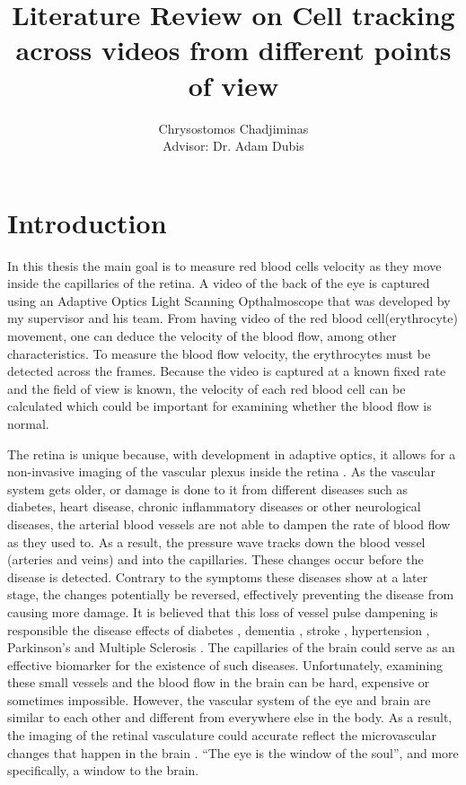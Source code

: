 \documentclass[]{article}
\title{Literature Review on Cell tracking across videos from different points of view}
\author{Chrysostomos Chadjiminas 
	\\[0.55cm]{\small Advisor: Dr. Adam Dubis}}
\begin{document}
\maketitle

\section{Introduction}

In this thesis the main goal is to measure red blood cells velocity as 
they move inside the capillaries of the retina.
A video of the back of the eye is captured using an Adaptive Optics Light Scanning Opthalmoscope that was developed by my supervisor and his team.
From having video of the red blood cell(erythrocyte) movement, one can deduce the velocity of the blood flow, among other characteristics.
To measure the blood flow velocity, the  erythrocytes must be detected across the frames. 
Because the video is captured at a known fixed rate and the field of view is known, the velocity of each red blood cell can be calculated
which could be important for examining whether the blood flow is normal.

The retina is unique because, with development in adaptive optics, it allows for a non-invasive imaging of the vascular plexus inside the retina \cite{tam_noninvasive_2010}.
As the vascular system gets older, or damage is done to it from different diseases such as diabetes, heart disease, chronic inflammatory diseases or other neurological diseases, the arterial blood vessels are not able to dampen the rate of blood flow as they used to.
As a result, the pressure wave tracks down the blood vessel (arteries and veins) and into the capillaries. 
These changes occur before the disease is detected. 
Contrary to the symptoms these diseases show at a later stage, the changes potentially be reversed, effectively preventing the disease from causing more damage.
It is believed that this loss of vessel pulse dampening is responsible the disease effects of diabetes \cite{mizutani_accelerated_diabetes_1996}, dementia \cite{de_la_torre_is_alzheimer_2004}, stroke \cite{ostergaard_role_stroke_2013}, hypertension \cite{wolf_s_quantification_hypertension_1994}, Parkinson's and Multiple Sclerosis \cite{bateman_comparison_multiple_sclerosis_2016}.
The capillaries of the brain could serve as an effective biomarker for the existence of such diseases.
Unfortunately, examining these small vessels and the blood flow in the brain can be hard, expensive or sometimes impossible.
However, the vascular system of the eye and brain are similar to each other and different from everywhere else in the body.
As a result, the imaging of the retinal vasculature could accurate reflect the microvascular changes that happen in the brain \cite{patton_retinal_brain_vasculature_similarity_2005}. ``The eye is the window of the soul'', and more specifically, a window to the brain.
\end{document}
